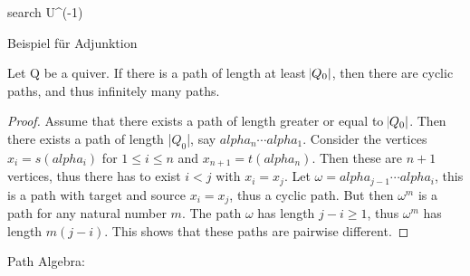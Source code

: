 search U^(-1)

Beispiel für Adjunktion

\begin{lemma} Let Q be a quiver. If there is a path of length at least $\abs{Q_{0}}$, then there are cyclic paths,
and thus infinitely many paths.
\end{lemma}
\begin{proof}
Assume that there exists a path of length greater or equal to $\abs{Q_{0}}$. Then there exists a path of length |$Q_{0}$|, say
$alpha_{n}\cdots alpha_{1}$. Consider the vertices $x_{i}=s(alpha_{i})$ for $1 \leq i \leq n$ and $x_{n+1}=t(alpha_{n})$. Then these
are $n+1$ vertices, thus there has to exist $i<j$ with $x_{i}=x_{j}$. Let $\omega=alpha_{j-1}\cdots alpha_{i}$, this is a path with target and source
$x_{i}=x_{j}$, thus a cyclic path. But then $\omega^{m}$ is a path for any natural number $m$. The path $\omega$ has length $j-i\geq1$, thus
$\omega^{m}$ has length $m(j-i)$. This shows that these paths are pairwise different.
\end{proof}
Path Algebra: